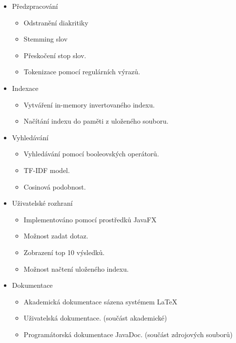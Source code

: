 \documentclass[12pt, a4paper]{article}
\begin{document}
\begin{itemize}
\item Předzpracování
	\begin{itemize}
		\item Odstranění diakritiky
		\item Stemming slov
		\item Přeskočení stop slov.
		\item Tokenizace pomocí regulárních výrazů.
	\end{itemize}
\item{Indexace}
		\begin{itemize}
		\item Vytváření in-memory invertovaného indexu.
		\item Načítání indexu do paměti z uloženého souboru.
	\end{itemize}
\item{Vyhledávání}
	\begin{itemize}
		\item Vyhledávání pomocí booleovských operátorů.
		\item TF-IDF model.
		\item Cosinová podobnost.
	\end{itemize}
\item{Uživatelské rozhraní}
	\begin{itemize}
		\item Implementováno pomocí prostředků JavaFX
		\item Možnost zadat dotaz.
		\item Zobrazení top 10 výsledků.
		\item Možnost načtení uloženého indexu.
	\end{itemize}
\item{Dokumentace}
	\begin{itemize}
		\item Akademická dokumentace sázena systémem \LaTeX
		\item Uživatelská dokumentace. (součást akademické)
		\item Programátorská dokumentace JavaDoc. (součást zdrojových souborů) 
	\end{itemize}	
\end{itemize}
\end{document}
